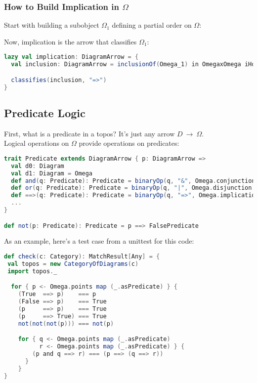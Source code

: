 \documentclass[10pt]{asme2ej}
\begin{document}
\subsubsection{How to Build Implication in $\Omega$}

Start with building a subobject $\Omega_1$ defining a partial order on $\Omega$:


Now, implication is the arrow that classifies $\Omega_1$:


\begin{lstlisting}[language=Scala]
lazy val implication: DiagramArrow = {
  val inclusion: DiagramArrow = inclusionOf(Omega_1) in OmegaxOmega iHope

  classifies(inclusion, "=>")
}
\end{lstlisting}

\subsection{Predicate Logic}

First, what is a predicate in a topos? It's just any arrow
$D\ \rightarrow\ \Omega$.\\

Logical operations on $\Omega$ provide operations on predicates:

\begin{lstlisting}[language=Scala]
trait Predicate extends DiagramArrow { p: DiagramArrow =>
  val d0: Diagram
  val d1: Diagram = Omega
  def and(q: Predicate): Predicate = binaryOp(q, "&", Omega.conjunction)
  def or(q: Predicate): Predicate = binaryOp(q, "|", Omega.disjunction)
  def ==>(q: Predicate): Predicate = binaryOp(q, "=>", Omega.implication)
  ...
}

def not(p: Predicate): Predicate = p ==> FalsePredicate
\end{lstlisting}


As an example, here's a test case from a unittest for this code:

\begin{lstlisting}[language=Scala]
def check(c: Category): MatchResult[Any] = {
 val topos = new CategoryOfDiagrams(c)
 import topos._

  for { p <- Omega.points map (_.asPredicate) } {
    (True  ==> p)    === p
    (False ==> p)    === True
    (p     ==> p)    === True
    (p     ==> True) === True
    not(not(not(p))) === not(p)

    for { q <- Omega.points map (_.asPredicate)
          r <- Omega.points map (_.asPredicate) } {
        (p and q ==> r) === (p ==> (q ==> r))
      }
    }
}
\end{lstlisting}
\end{document}
